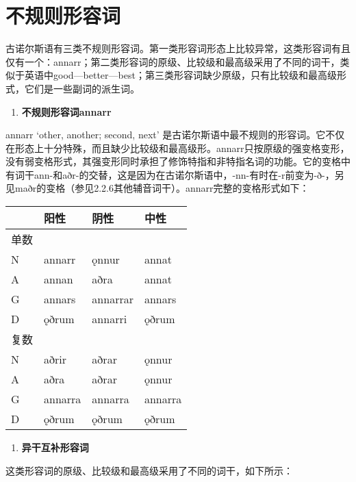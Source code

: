 \section{不规则形容词}\label{不规则形容词}

古诺尔斯语有三类不规则形容词。第一类形容词形态上比较异常，这类形容词有且仅有一个：annarr；第二类形容词的原级、比较级和最高级采用了不同的词干，类似于英语中good---better---best；第三类形容词缺少原级，只有比较级和最高级形式，它们是一些副词的派生词。

\begin{enumerate}
  \def\labelenumi{\arabic{enumi})}
  \item
        \textbf{不规则形容词annarr}
\end{enumerate}

annarr `other, another; second, next‌'
是古诺尔斯语中最不规则的形容词。它不仅在形态上十分特殊，而且缺少比较级和最高级形。annarr只按原级的强变格变形，没有弱变格形式，其强变形同时承担了修饰特指和非特指名词的功能。它的变格中有词干ann-和aðr-的交替，这是因为在古诺尔斯语中，-nn-有时在-r前变为-ð-，另见maðr的变格（参见2.2.6其他辅音词干）。annarr完整的变格形式如下：

\begin{longtable}{llll}
  \toprule
     & 阳性      & 阴性       & 中性      \\
  \midrule
  \endhead
  \bottomrule
  \endfoot
  单数 &         &          &         \\
  N  & annarr  & ǫnnur    & annat   \\
  A  & annan   & aðra     & annat   \\
  G  & annars  & annarrar & annars  \\
  D  & ǫðrum   & annarri  & ǫðrum   \\
  复数 &         &          &         \\
  N  & aðrir   & aðrar    & ǫnnur   \\
  A  & aðra    & aðrar    & ǫnnur   \\
  G  & annarra & annarra  & annarra \\
  D  & ǫðrum   & ǫðrum    & ǫðrum   \\
\end{longtable}

\begin{enumerate}
  \def\labelenumi{\arabic{enumi})}
  \setcounter{enumi}{1}
  \item
        \textbf{异干互补形容词}
\end{enumerate}

这类形容词的原级、比较级和最高级采用了不同的词干，如下所示：

